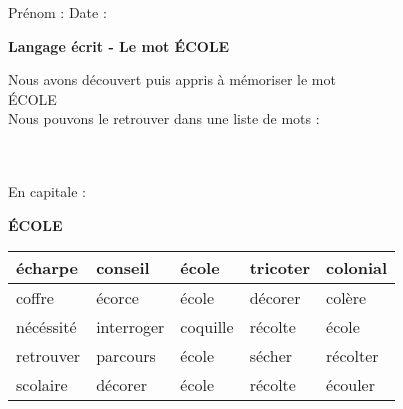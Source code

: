\documentclass[a4paper, 11pt,oneside, fleqn]{article}
\begin{document}
\newcommand{\x}{\times}
\renewcommand{\arraystretch}{1.5}

\sloppy
\pagestyle{empty}
\begin{onehalfspace}


\sffamily \noindent \Large Pr\'enom : \fbox{\begin{minipage}{9cm} \vspace{1.2cm}\hspace{9cm} \end{minipage}} \hspace{1.5cm}\Large Date :\vspace{2mm}\\
\begin{minipage}{12cm}
\begin{center}
\Large\textbf{Langage \'ecrit - Le mot \MakeUppercase{école}}
\end{center}
\normalsize Nous avons d\'ecouvert puis appris \`a m\'emoriser le mot\\
\MakeUppercase{école}\\
Nous pouvons le retrouver dans une liste de mots : \end{minipage}\\
\vspace{0.25cm}\\
 
\large\noindent En capitale :
\begin{center}
{\huge \textbf{\MakeUppercase{école}}}
\vspace{0.25cm}\\
\begin{tabulary}{17cm}{|g|g|g|g|g|}
\hline
écharpe & conseil & école & tricoter & colonial \\
\hline
coffre & écorce & école & décorer & colère \\
\hline
nécéssité & interroger & coquille & récolte & école \\
\hline
retrouver & parcours & école & sécher & récolter \\
\hline
scolaire & décorer & école & récolte & écouler \\
\hline
\end{tabulary}
\end{center}
\vspace{0.5cm}


\end{onehalfspace}
\end{document}
